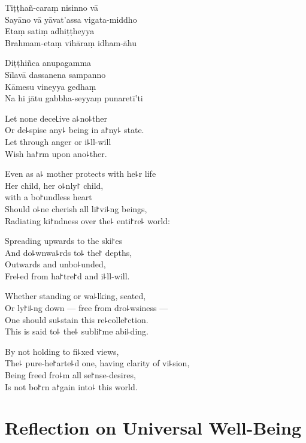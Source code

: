 Tiṭṭhañ-caraṃ nisinno vā\\
Sayāno vā yāvat'assa vigata-middho\\
Etaṃ satiṃ adhiṭṭheyya\\
Brahmam-etaṃ vihāraṃ idham-āhu

Diṭṭhiñca anupagamma\\
Sīlavā dassanena sampanno\\
Kāmesu vineyya gedhaṃ\\
Na hi jātu gabbha-seyyaṃ punaretī'ti

\clearpage

Let none dece꜖ive a꜕no꜕ther\\%
Or de꜕spise any꜕ being in a꜓ny꜕ state.\\
Let  through anger or i꜕ll-will\\
Wish ha꜓rm upon ano꜕ther.

Even as a꜕ mother protects with he꜕r life\\
Her child, her o꜕nly꜓ child,\\
 with a bo꜓undless heart\\
Should o꜕ne cherish all li꜓vi꜕ng beings,\\
Radiating ki꜓ndness over the꜕ enti꜓re꜕ world:

Spreading upwards to the ski꜓es\\
And do꜕wnwa꜕rds to꜕ the꜓ depths,\\
Outwards and unbo꜕unded,\\
Fre꜕ed from ha꜓tre꜓d and i꜕ll-will.

Whether standing or wa꜕lking, seated, \\
Or ly꜓i꜕ng down --- free from dro꜕wsiness ---\\
One should su꜕stain this re꜕colle꜓ction.\\
This is said to꜕  the꜕ subli꜓me abi꜕ding.

By not holding to fi꜕xed views,\\
The꜕ pure-he꜓arte꜕d one, having clarity of vi꜕sion,\\
Being freed fro꜕m all se꜓nse-desires,\\
Is not bo꜓rn a꜓gain into꜕ this world.

\chapter*[Universal Well-Being]{Reflection on Universal Well-Being}%

\delegateSetUseNext


